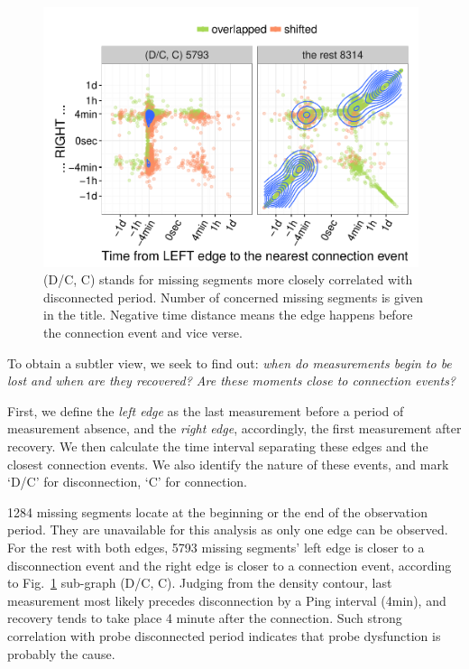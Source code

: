 \begin{figure}[!htb]
\centering
\includegraphics[width=0.98\textwidth]{gfx/chap3/all.pdf}
\caption{(D/C, C) stands for missing segments more closely correlated with disconnected period.
Number of concerned missing segments is given in the title. Negative time distance means the edge happens before the connection event and vice verse.}
\label{fig:all}
\end{figure}

To obtain a subtler view, we seek to find out: \textit{when do measurements begin to be lost and when are they recovered? Are these moments close to connection events?}

First, we define the \textit{left edge} as the last measurement before a period of measurement absence, and the \textit{right edge}, accordingly, the first measurement after recovery. 
We then calculate the time interval separating these edges and the closest connection events. We also identify the nature of these events, and mark `D/C' for disconnection, `C' for connection. 

1284 missing segments locate at the beginning or the end of the observation period. 
They are unavailable for this analysis as only one edge can be observed.
For the rest with both edges, 5793 missing segments' left edge is closer to a disconnection event and the right edge is closer to a connection event, according to Fig.~\ref{fig:all} sub-graph (D/C, C).
Judging from the density contour, last measurement most likely precedes disconnection by a Ping interval (4min), and recovery tends to take place 4 minute after the connection.
Such strong correlation with probe disconnected period indicates that probe dysfunction is probably the cause.

